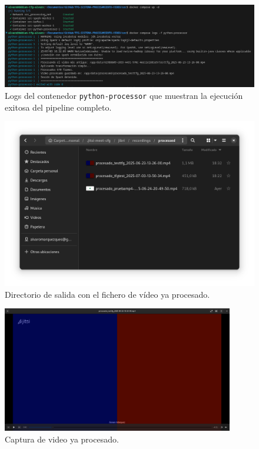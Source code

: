 \begin{figure}[H]
    \centering
    \includegraphics[width=\textwidth]{img/logsfinalpy.png}
    \caption{Logs del contenedor \texttt{python-processor} que muestran la ejecución exitosa del pipeline completo.}
    \label{fig:apendice_d_logs_finales}
\end{figure}
\begin{figure}[H]
    \centering
    \includegraphics[width=1\textwidth]{img/carpetaprocessed.png}
    \caption{Directorio de salida con el fichero de vídeo ya procesado.}
    \label{fig:apendice_d_carpeta_procesado}
\end{figure}
\begin{figure}[H]
    \centering
    \includegraphics[width=0.9\textwidth]{img/resultado-procesamiento.png}
    \caption{Captura de video ya procesado.}
    \label{fig:prueba_funcional}
\end{figure}

